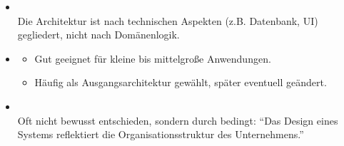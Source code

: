 \begin{infoBox}[title=Zusammenfassung]
    \begin{itemize}
        \item {} \\
        Die Architektur ist nach technischen Aspekten (z.B. Datenbank, UI) gegliedert, nicht nach Domänenlogik.
        \item {}
        \begin{itemize}
            \item Gut geeignet für kleine bis mittelgroße Anwendungen.
            \item Häufig als Ausgangsarchitektur gewählt, später eventuell geändert.
        \end{itemize}
        \item {}\\
        Oft nicht bewusst entschieden, sondern durch  bedingt: \enquote{Das Design eines Systems reflektiert die Organisationsstruktur des Unternehmens.}
    \end{itemize}
\end{infoBox}

\clearpage
